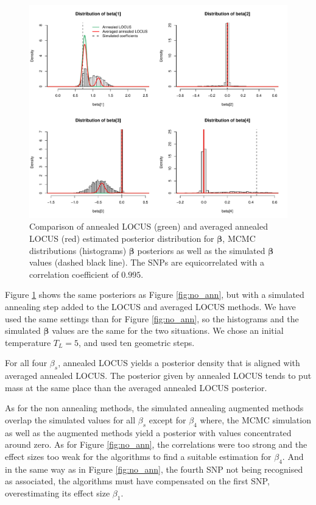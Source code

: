 \documentclass[a4paper, 11pt]{report}
\numberwithin{equation}{chapter}
\begin{document}
\begin{figure}[h]
\centering
\includegraphics[width=\textwidth, bb=0 0 9.8in 8.07in]{images/MCMC_anneal.pdf}
\caption{\label{fig:ann}Comparison of annealed LOCUS (green) and averaged annealed LOCUS (red) estimated posterior distribution for $\boldsymbol{\beta}$, MCMC distributions (histograms) $\boldsymbol{\beta}$ posteriors as well as the simulated $\boldsymbol{\beta}$ values (dashed black line). The SNPs are equicorrelated with a correlation coefficient of $0.995$.}
\end{figure}

Figure \ref{fig:ann} shows the same posteriors as Figure \ref{fig:no_ann}, but with a simulated annealing step added to the LOCUS and averaged LOCUS methods. We have used the same settings than for Figure \ref{fig:no_ann}, so the histograms and the simulated $
\boldsymbol{\beta}$ values are the same for the two situations. We chose an initial temperature $T_L = 5$, and used ten geometric steps.

For all four $\beta_s$, annealed LOCUS yields a posterior density that is aligned with averaged annealed LOCUS. The posterior given by annealed LOCUS tends to put mass at the same place than the averaged annealed LOCUS posterior.

As for the non annealing methods, the simulated annealing augmented methods overlap the simulated values for all $\beta_s$ except for $\beta_4$ where, the MCMC simulation as well as the augmented methods yield a posterior with values concentrated around zero. As for Figure \ref{fig:no_ann}, the correlations were too strong and the effect sizes too weak for the algorithms to find a suitable estimation for $\beta_4$. And in the same way as in Figure \ref{fig:no_ann}, the fourth SNP not being recognised as associated, the algorithms must have compensated on the first SNP, overestimating its effect size $\beta_1$.
\end{document}
